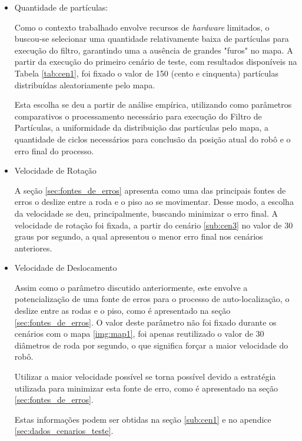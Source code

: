 \begin{itemize}
  \item Quantidade de partículas:

    Como o contexto trabalhado envolve recursos de \textit{hardware} limitados, o buscou-se selecionar uma quantidade relativamente
    baixa de partículas para execução do filtro, garantindo uma a ausência de grandes "furos" no mapa. A partir da execução do primeiro
    cenário de teste, com resultados disponíveis na Tabela \ref{tab:cen1}, foi fixado o valor de 150 (cento e cinquenta) partículas
    distribuídas aleatoriamente pelo mapa.

    Esta escolha se deu a partir de análise empírica, utilizando como parâmetros comparativos o processamento necessário para execução
    do Filtro de Partículas, a uniformidade da distribuição das partículas pelo mapa, a quantidade de ciclos necessários para conclusão
    da posição atual do robô e o erro final do processo.

  \item Velocidade de Rotação

    A seção \ref{sec:fontes_de_erros} apresenta como uma das principais fontes de erros o deslize entre a roda e o piso ao se movimentar.
    Desse modo, a escolha da velocidade se deu, principalmente, buscando minimizar o erro final. A velocidade de rotação foi fixada,
    a partir do cenário \ref{sub:cen3} no valor de 30 graus por segundo, a qual apresentou o menor erro final nos cenários anteriores.

  \item Velocidade de Deslocamento

    Assim como o parâmetro discutido anteriormente, este envolve a potencialização de uma fonte de erros para o processo
    de auto-localização, o deslize entre as rodas e o piso, como é apresentado na seção \ref{sec:fontes_de_erros}. O valor deste parâmetro
    não foi fixado durante os cenários com o mapa \ref{img:map1}, foi apenas reutilizado o valor de 30 diâmetros de roda por segundo,
    o que significa forçar a maior velocidade do robô.

    Utilizar a maior velocidade possível se torna possível devido a estratégia utilizada para minimizar esta fonte de erro, como é
    apresentado na seção \ref{sec:fontes_de_erros}.


  Estas informações podem ser obtidas na seção \ref{sub:cen1} e no apendice \ref{sec:dados_cenarios_teste}.
\end{itemize}

